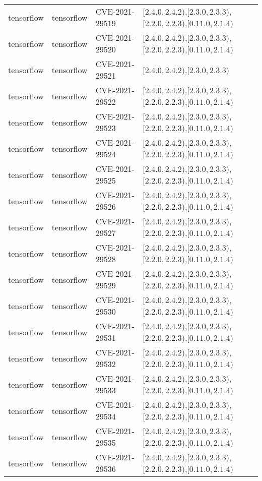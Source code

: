 \begin{tabular}{llll}
tensorflow & tensorflow & CVE-2021-29519 & $[2.4.0,2.4.2)$,$[2.3.0,2.3.3)$,$[2.2.0,2.2.3)$,$[0.11.0,2.1.4)$ \\
tensorflow & tensorflow & CVE-2021-29520 & $[2.4.0,2.4.2)$,$[2.3.0,2.3.3)$,$[2.2.0,2.2.3)$,$[0.11.0,2.1.4)$ \\
tensorflow & tensorflow & CVE-2021-29521 & $[2.4.0,2.4.2)$,$[2.3.0,2.3.3)$ \\
tensorflow & tensorflow & CVE-2021-29522 & $[2.4.0,2.4.2)$,$[2.3.0,2.3.3)$,$[2.2.0,2.2.3)$,$[0.11.0,2.1.4)$ \\
tensorflow & tensorflow & CVE-2021-29523 & $[2.4.0,2.4.2)$,$[2.3.0,2.3.3)$,$[2.2.0,2.2.3)$,$[0.11.0,2.1.4)$ \\
tensorflow & tensorflow & CVE-2021-29524 & $[2.4.0,2.4.2)$,$[2.3.0,2.3.3)$,$[2.2.0,2.2.3)$,$[0.11.0,2.1.4)$ \\
tensorflow & tensorflow & CVE-2021-29525 & $[2.4.0,2.4.2)$,$[2.3.0,2.3.3)$,$[2.2.0,2.2.3)$,$[0.11.0,2.1.4)$ \\
tensorflow & tensorflow & CVE-2021-29526 & $[2.4.0,2.4.2)$,$[2.3.0,2.3.3)$,$[2.2.0,2.2.3)$,$[0.11.0,2.1.4)$ \\
tensorflow & tensorflow & CVE-2021-29527 & $[2.4.0,2.4.2)$,$[2.3.0,2.3.3)$,$[2.2.0,2.2.3)$,$[0.11.0,2.1.4)$ \\
tensorflow & tensorflow & CVE-2021-29528 & $[2.4.0,2.4.2)$,$[2.3.0,2.3.3)$,$[2.2.0,2.2.3)$,$[0.11.0,2.1.4)$ \\
tensorflow & tensorflow & CVE-2021-29529 & $[2.4.0,2.4.2)$,$[2.3.0,2.3.3)$,$[2.2.0,2.2.3)$,$[0.11.0,2.1.4)$ \\
tensorflow & tensorflow & CVE-2021-29530 & $[2.4.0,2.4.2)$,$[2.3.0,2.3.3)$,$[2.2.0,2.2.3)$,$[0.11.0,2.1.4)$ \\
tensorflow & tensorflow & CVE-2021-29531 & $[2.4.0,2.4.2)$,$[2.3.0,2.3.3)$,$[2.2.0,2.2.3)$,$[0.11.0,2.1.4)$ \\
tensorflow & tensorflow & CVE-2021-29532 & $[2.4.0,2.4.2)$,$[2.3.0,2.3.3)$,$[2.2.0,2.2.3)$,$[0.11.0,2.1.4)$ \\
tensorflow & tensorflow & CVE-2021-29533 & $[2.4.0,2.4.2)$,$[2.3.0,2.3.3)$,$[2.2.0,2.2.3)$,$[0.11.0,2.1.4)$ \\
tensorflow & tensorflow & CVE-2021-29534 & $[2.4.0,2.4.2)$,$[2.3.0,2.3.3)$,$[2.2.0,2.2.3)$,$[0.11.0,2.1.4)$ \\
tensorflow & tensorflow & CVE-2021-29535 & $[2.4.0,2.4.2)$,$[2.3.0,2.3.3)$,$[2.2.0,2.2.3)$,$[0.11.0,2.1.4)$ \\
tensorflow & tensorflow & CVE-2021-29536 & $[2.4.0,2.4.2)$,$[2.3.0,2.3.3)$,$[2.2.0,2.2.3)$,$[0.11.0,2.1.4)$ \\

\end{tabular}
